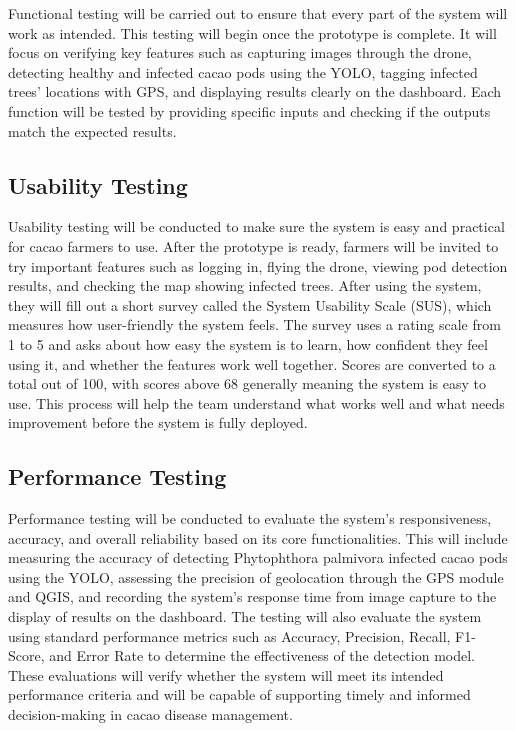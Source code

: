 Functional testing will be carried out to ensure that every part of the system will work as intended. This testing will begin once the prototype is complete. It will focus on verifying key features such as capturing images through the drone, detecting healthy and infected cacao pods using the YOLO, tagging infected trees’ locations with GPS, and displaying results clearly on the dashboard. Each function will be tested by providing specific inputs and checking if the outputs match the expected results.

\subsection{Usability Testing}

Usability testing will be conducted to make sure the system is easy and practical for cacao farmers to use. After the prototype is ready, farmers will be invited to try important features such as logging in, flying the drone, viewing pod detection results, and checking the map showing infected trees. After using the system, they will fill out a short survey called the System Usability Scale (SUS), which measures how user-friendly the system feels. The survey uses a rating scale from 1 to 5 and asks about how easy the system is to learn, how confident they feel using it, and whether the features work well together. Scores are converted to a total out of 100, with scores above 68 generally meaning the system is easy to use. This process will help the team understand what works well and what needs improvement before the system is fully deployed.
\pagebreak

\subsection*{Performance Testing}

Performance testing will be conducted to evaluate the system’s responsiveness, accuracy, and overall reliability based on its core functionalities. This will include measuring the accuracy of detecting Phytophthora palmivora infected cacao pods using the YOLO, assessing the precision of geolocation through the GPS module and QGIS, and recording the system’s response time from image capture to the display of results on the dashboard. The testing will also evaluate the system using standard performance metrics such as Accuracy, Precision, Recall, F1-Score, and Error Rate to determine the effectiveness of the detection model. These evaluations will verify whether the system will meet its intended performance criteria and will be capable of supporting timely and informed decision-making in cacao disease management.

